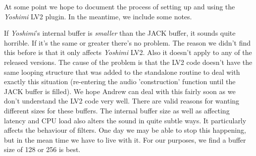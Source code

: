    At some point we hope to document the process of setting up and using
   the \textsl{Yoshimi} LV2 plugin.  In the meantime, we include some notes.

   If \textsl{Yoshimi}'s internal buffer is \textsl{smaller} than the JACK
   buffer, it sounds quite horrible. If it's the same or greater there's no
   problem. The reason we didn't find this before is that it only affects
   \textsl{Yoshimi} LV2.  Also it doesn't apply to any of the released
   versions.  The cause of the problem is that the LV2 code doesn't have the
   same looping structure that was added to the standalone routine to deal with
   exactly this situation (re-entering the audio 'construction' function until
   the JACK buffer is filled). We hope Andrew can deal with this fairly soon as
   we don't understand the LV2 code very well.  There are valid reasons for
   wanting different sizes for these buffers. The internal buffer size as well
   as affecting latency and CPU load also alters the sound in quite subtle
   ways. It particularly affects the behaviour of filters.  One day we may be
   able to stop this happening, but in the mean time we have to live with it.
   For our purposes, we find a buffer size of 128 or 256 is best.

